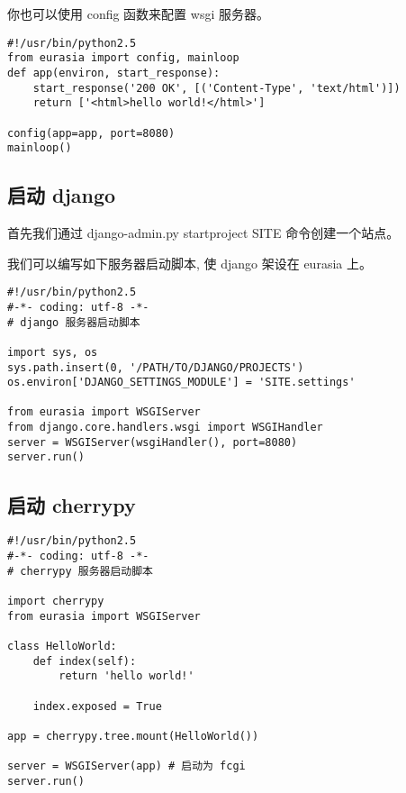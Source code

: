 \documentclass{manual}
\begin{document}

你也可以使用 config 函数来配置 wsgi 服务器。

\begin{verbatim}
#!/usr/bin/python2.5
from eurasia import config, mainloop
def app(environ, start_response):
	start_response('200 OK', [('Content-Type', 'text/html')])
	return ['<html>hello world!</html>']

config(app=app, port=8080)
mainloop()
\end{verbatim}


\subsection{启动 django}

首先我们通过 django-admin.py startproject SITE 命令创建一个站点。

我们可以编写如下服务器启动脚本, 使 django 架设在 eurasia 上。

\begin{verbatim}
#!/usr/bin/python2.5
#-*- coding: utf-8 -*-
# django 服务器启动脚本

import sys, os
sys.path.insert(0, '/PATH/TO/DJANGO/PROJECTS')
os.environ['DJANGO_SETTINGS_MODULE'] = 'SITE.settings'

from eurasia import WSGIServer
from django.core.handlers.wsgi import WSGIHandler
server = WSGIServer(wsgiHandler(), port=8080)
server.run()
\end{verbatim}


\subsection{启动 cherrypy}

\begin{verbatim}
#!/usr/bin/python2.5
#-*- coding: utf-8 -*-
# cherrypy 服务器启动脚本

import cherrypy
from eurasia import WSGIServer

class HelloWorld:
	def index(self):
		return 'hello world!'

	index.exposed = True

app = cherrypy.tree.mount(HelloWorld())

server = WSGIServer(app) # 启动为 fcgi
server.run()
\end{verbatim}
\end{document}
